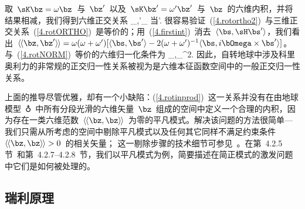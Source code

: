 取~$\sK\bz=\omega\bz$~与~$\bz'$~以及~$\sK\bz'=\omega'\bz'$~与~$\bz$~的六维内积，并将结果相减，我们得到六维正交关系
%
\eq
\label{4.rotortho2}
\langle_{\!}\langle\bz,\bz'\rangle_{\!}
\quad\mbox{当}\quad\omega\neq\omega'.
\en
很容易验证~(\ref{4.rotortho2})~与三维正交关系~(\ref{4.rotORTHO})~是等价的；用~(\ref{4.firstint})~消去~$\langle\bs,\sH\bs'\rangle$，我们看出~$\langle_{\!}\langle\bz,\bz'\rangle_{\!}\rangle=\omega(\omega+\omega')
[\langle\bs,\bs'\rangle-2(\omega+\omega')^{-1}
\langle\bs,i\bOmega\times\bs'\rangle]$。
与~(\ref{4.rotNORM})~等价的六维归一化条件为
\eq
\label{4.newNORM}
\langle_{\!}\langle\bz,\bz\rangle_{\!}\omega^2.
\en
因此，自转地球中涉及科里奥利力的非常规的正交归一性关系被视为是六维本征函数空间中的一般正交归一性关系。

上面的推导尽管优雅，却有一个小缺陷：(\ref{4.rotinprod})~这一关系并没有在由地球模型~$\earth$~中所有分段光滑的六维矢量~$\bz$~组成的空间中定义一个合理的内积，因为存在一类六维范数~$\langle_{\!}\langle\bz,\bz\rangle_{\!}\rangle$~为零的平凡模式。解决该问题的方法很简单---我们只需从所考虑的空间中剔除平凡模式以及任何其它同样不满足约束条件~$\langle_{\!}\langle\bz,\bz
\rangle_{\!}\rangle > 0$~的相关矢量；
%
%
这一剔除步骤的技术细节可参见~\textcite{wahr81a}。在第~4.2.5节~和第~4.2.7--4.2.8~节，我们以平凡模式为例，简要描述在简正模式的激发问题中它们是如何被处理的。

\renewcommand{\thesubsection}{$\!\!\!\raise1.3ex\hbox{$\star$}\!\!$
\arabic{chapter}.\arabic{section}.\arabic{subsection}}
\subsection{瑞利原理}
\label{4.sec.rotRay}
%
\renewcommand{\thesubsection}{\arabic{chapter}.\arabic{section}.\arabic{subsection}}

